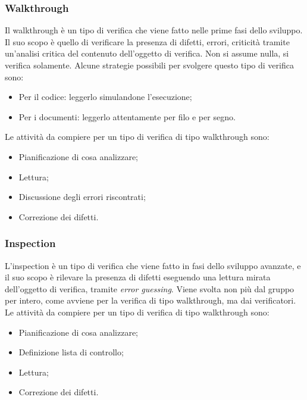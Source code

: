 \documentclass[../main]{subfiles}
\begin{document}
\subsubsection{Walkthrough}
Il walkthrough è un tipo di verifica che viene fatto nelle prime fasi dello sviluppo. Il suo scopo è quello di verificare la presenza di difetti, errori, criticità tramite un'analisi critica del contenuto dell'oggetto di verifica. Non si assume nulla, si verifica solamente. Alcune strategie possibili per svolgere questo tipo di verifica sono:
\begin{itemize}
    \item Per il codice: leggerlo simulandone l'esecuzione;
    \item Per i documenti: leggerlo attentamente per filo e per segno.
\end{itemize}
Le attività da compiere per un tipo di verifica di tipo walkthrough sono:
\begin{itemize}
    \item Pianificazione di cosa analizzare;
    \item Lettura;
    \item Discussione degli errori riscontrati;
    \item Correzione dei difetti.
\end{itemize}
\subsubsection{Inspection}
L'inspection è un tipo di verifica che viene fatto in fasi dello sviluppo avanzate, e il suo scopo è rilevare la presenza di difetti eseguendo una lettura mirata dell'oggetto di verifica, tramite \textit{error guessing}. Viene svolta non più dal gruppo per intero, come avviene per la verifica di tipo walkthrough, ma dai verificatori.\newline
Le attività da compiere per un tipo di verifica di tipo walkthrough sono:
\begin{itemize}
    \item Pianificazione di cosa analizzare;
    \item Definizione lista di controllo;
    \item Lettura;
    \item Correzione dei difetti.
\end{itemize}
\end{document}
